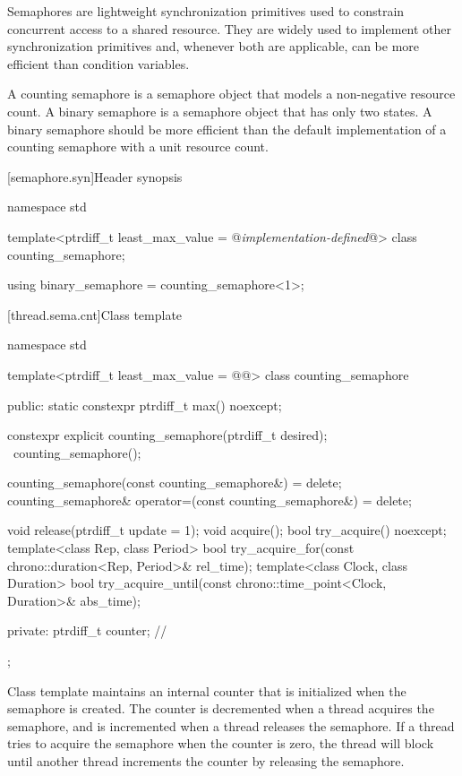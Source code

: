 \pnum
Semaphores are lightweight synchronization primitives
used to constrain concurrent access to a shared resource.
They are widely used to implement other synchronization primitives and,
whenever both are applicable, can be more efficient than condition variables.

\pnum
A counting semaphore is a semaphore object
that models a non-negative resource count.
A binary semaphore is a semaphore object that has only two states.
A binary semaphore should be more efficient than
the default implementation of a counting semaphore with a unit resource count.

[semaphore.syn]{Header  synopsis}

%
\begin{codeblock}
namespace std {
  template<ptrdiff_t least_max_value = @\textrm{\textit{implementation-defined}}@>
    class counting_semaphore;

  using binary_semaphore = counting_semaphore<1>;
}
\end{codeblock}

[thread.sema.cnt]{Class template }

\begin{codeblock}
namespace std {
  template<ptrdiff_t least_max_value = @\textrm{\textit{}}@>
  class counting_semaphore {
  public:
    static constexpr ptrdiff_t max() noexcept;

    constexpr explicit counting_semaphore(ptrdiff_t desired);
    ~counting_semaphore();

    counting_semaphore(const counting_semaphore&) = delete;
    counting_semaphore& operator=(const counting_semaphore&) = delete;

    void release(ptrdiff_t update = 1);
    void acquire();
    bool try_acquire() noexcept;
    template<class Rep, class Period>
      bool try_acquire_for(const chrono::duration<Rep, Period>& rel_time);
    template<class Clock, class Duration>
      bool try_acquire_until(const chrono::time_point<Clock, Duration>& abs_time);

  private:
    ptrdiff_t counter;          // \expos
  };
}
\end{codeblock}

\pnum
Class template  maintains an internal counter
that is initialized when the semaphore is created.
The counter is decremented when a thread acquires the semaphore, and
is incremented when a thread releases the semaphore.
If a thread tries to acquire the semaphore when the counter is zero,
the thread will block
until another thread increments the counter by releasing the semaphore.

